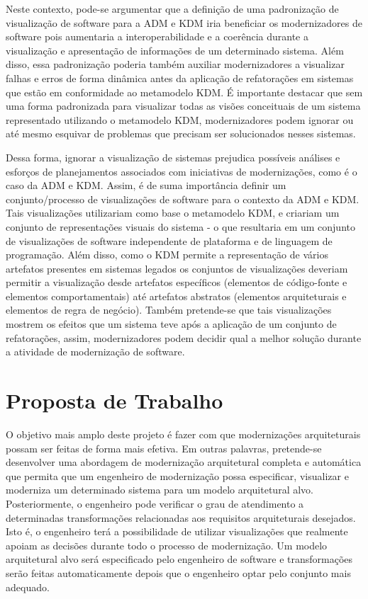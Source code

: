 \documentclass[12pt]{article}
\begin{document}
Neste contexto, pode-se argumentar que a definição de uma padronização de visualização de software para a ADM e KDM iria beneficiar os modernizadores de software pois aumentaria a interoperabilidade e a coerência durante a visualização e apresentação de informações de um determinado sistema. Além disso, essa padronização poderia também auxiliar modernizadores a visualizar falhas e erros  de forma dinâmica antes da aplicação de refatorações em sistemas que estão em conformidade ao metamodelo KDM. É importante destacar que sem uma forma padronizada para visualizar todas as visões conceituais de um sistema representado utilizando o metamodelo KDM, modernizadores podem ignorar ou até mesmo esquivar de problemas que precisam ser solucionados nesses sistemas. 

Dessa forma, ignorar a visualização de sistemas prejudica possíveis análises e esforços de planejamentos associados com iniciativas de modernizações, como é o caso da ADM e KDM. Assim, é de suma importância definir um conjunto/processo de visualizações de software para o contexto da ADM e KDM. Tais visualizações utilizariam como base o metamodelo KDM, e criariam um conjunto de representações visuais do sistema - o que resultaria em um conjunto de visualizações de software independente de plataforma e de linguagem de programação. Além disso, como o KDM permite a representação de vários artefatos presentes em sistemas legados os conjuntos de visualizações deveriam permitir a visualização desde artefatos específicos (elementos de código-fonte e elementos comportamentais) até artefatos abstratos (elementos arquiteturais e elementos de regra de negócio). Também pretende-se que tais visualizações mostrem os efeitos que um sistema teve após a aplicação de um conjunto de refatorações, assim, modernizadores podem decidir qual a melhor solução durante a atividade de modernização de software.

\section{Proposta de Trabalho}\label{sec:proposta_de_trabalho}

O objetivo mais amplo deste projeto é fazer com que modernizações arquiteturais possam ser feitas de forma mais efetiva. Em outras palavras, pretende-se desenvolver uma abordagem de modernização arquitetural completa e automática que permita que um engenheiro de modernização possa especificar, visualizar e moderniza um determinado sistema para um modelo arquitetural alvo. Posteriormente, o engenheiro pode verificar o grau de atendimento a determinadas transformações relacionadas aos requisitos arquiteturais desejados. Isto é, o engenheiro terá a possibilidade de utilizar visualizações que realmente apoiam as decisões durante todo o processo de modernização. Um modelo arquitetural alvo será especificado pelo engenheiro de software e transformações serão feitas automaticamente depois que o engenheiro optar pelo conjunto mais adequado.
\end{document}
